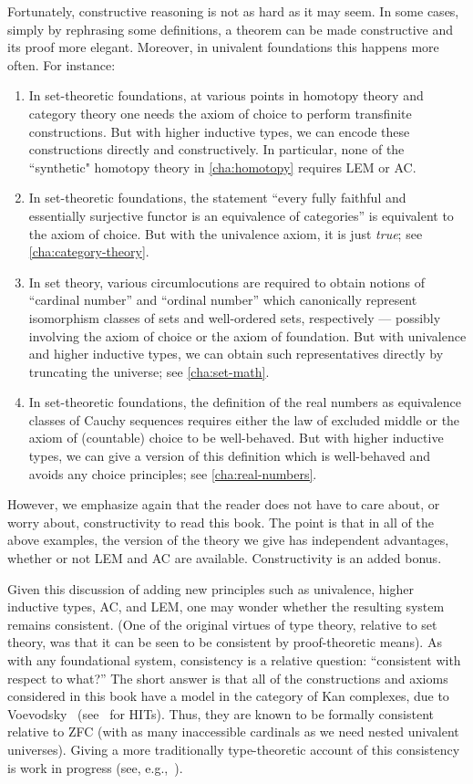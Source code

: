 Fortunately, constructive reasoning is not as hard as it may seem.
In some cases, simply by rephrasing some definitions, a theorem can be made constructive and its proof more elegant.
Moreover, in univalent foundations this happens more often.
For instance:
\begin{enumerate}
\item In set-theoretic foundations, at various points in homotopy theory and category theory one needs the axiom of choice to perform transfinite constructions.
  But with higher inductive types, we can encode these constructions directly and constructively.
  In particular, none of the ``synthetic" homotopy theory in \autoref{cha:homotopy} requires LEM or AC.
\item In set-theoretic foundations, the statement ``every fully faithful and essentially surjective functor is an equivalence of categories'' is equivalent to the axiom of choice.
  But with the univalence axiom, it is just \emph{true}; see \autoref{cha:category-theory}.
\item In set theory, various circumlocutions are required to obtain notions of ``cardinal number'' and ``ordinal number'' which canonically represent isomorphism classes of sets and well-ordered sets, respectively --- possibly involving the axiom of choice or the axiom of foundation.
  But with univalence and higher inductive types, we can obtain such representatives directly by truncating the universe; see \autoref{cha:set-math}.
\item In set-theoretic foundations, the definition of the real numbers as equivalence classes of Cauchy sequences requires either the law of excluded middle or the axiom of (countable) choice to be well-behaved.
  But with higher inductive types, we can give a version of this definition which is well-behaved and avoids any choice principles; see \autoref{cha:real-numbers}.
\end{enumerate}
However, we emphasize again that the reader does not have to care about, or worry about, constructivity to read this book.
The point is that in all of the above examples, the version of the theory we give has independent advantages, whether or not LEM and AC are available.
Constructivity is an added bonus.

Given this discussion of adding new principles such as univalence, higher inductive types, AC, and LEM, one may wonder whether the resulting system remains consistent.
(One of the original virtues of type theory, relative to set theory, was that it can be seen to be consistent by proof-theoretic means).
As with any foundational system, consistency is a relative question: ``consistent with respect to what?''
The short answer is that all of the constructions and axioms considered in this book have a model in the category of Kan complexes, due to Voevodsky~\cite{klv:ssetmodel} (see~\cite{ls:hits} for HITs).
Thus, they are known to be formally consistent relative to ZFC (with as many inaccessible cardinals as we need nested univalent universes).
Giving a more traditionally type-theoretic account of this consistency is work in progress (see,
e.g.,~\cite{lh:canonicity,coquand2012constructive}).

